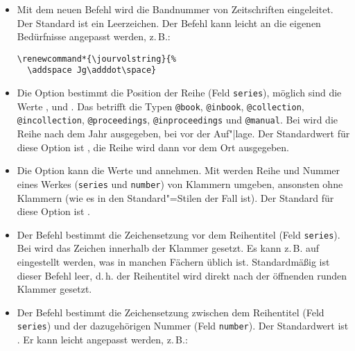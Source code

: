 \documentclass[ngerman]{scrartcl}
\begin{document}
\begin{itemize}
	      z.\,B.:
				\begin{lstlisting}
\renewcommand*{\journumstring}{\addspace}
				\end{lstlisting}
	\item Mit dem neuen Befehl  wird die Bandnummer von
	      Zeitschriften eingeleitet. Der Standard ist ein Leerzeichen. Der 
	      Befehl kann leicht an die eigenen Bedürfnisse angepasst werden, 
	      z.\,B.:
				\begin{lstlisting}
\renewcommand*{\jourvolstring}{%
  \addspace Jg\adddot\space}
				\end{lstlisting}
  \item Die
	      Option  bestimmt die Position der Reihe (Feld
        \texttt{series}), möglich sind die Werte ,  und . Das betrifft die Typen \texttt{@book}, 
        \texttt{@inbook}, \texttt{@collection}, \texttt{@incollection}, 
        \texttt{@proceedings}, \texttt{@inproceedings} und \texttt{@manual}. Bei  wird die Reihe nach dem Jahr ausgegeben, bei  vor der Auf"|lage.
        Der Standardwert für diese Option ist , die Reihe wird dann vor dem Ort ausgegeben.
	\item Die Option  kann
        die Werte  und  annehmen. Mit
         werden Reihe und Nummer eines Werkes (\texttt{series} und 
        \texttt{number}) von Klammern umgeben, ansonsten ohne Klammern (wie es
        in den Standard"=Stilen der Fall ist). Der Standard für diese Option ist
        .
  \item Der Befehl  bestimmt die Zeichensetzung vor dem 
        Reihentitel (Feld \texttt{series}). Bei 
        wird das Zeichen innerhalb der Klammer gesetzt. 
        Es kann z.\,B. auf  eingestellt 
        werden, was in manchen Fächern üblich ist. Standardmäßig ist dieser 
        Befehl leer, d.\,h. der Reihentitel wird direkt nach der öffnenden 
        runden Klammer gesetzt.
  \item Der Befehl  bestimmt die Zeichensetzung zwischen dem 
        Reihentitel (Feld \texttt{series}) und der dazugehörigen Nummer (Feld 
        \texttt{number}). Der Standardwert ist . Er kann 
        leicht angepasst werden, z.\,B.:
				\begin{lstlisting}

\end{lstlisting}
\end{itemize}
\end{document}
